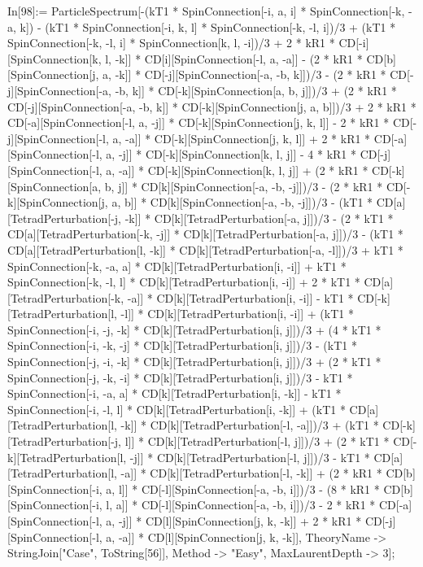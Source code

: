 In[98]:= ParticleSpectrum[-(kT1 * SpinConnection[-i, a, i] * SpinConnection[-k, -a, k]) - (kT1 * SpinConnection[-i, k, l] * SpinConnection[-k, -l, i])/3 + (kT1 * SpinConnection[-k, -l, i] * SpinConnection[k, l, -i])/3 + 2 * kR1 * CD[-i][SpinConnection[k, l, -k]] * CD[i][SpinConnection[-l, a, -a]] - (2 * kR1 * CD[b][SpinConnection[j, a, -k]] * CD[-j][SpinConnection[-a, -b, k]])/3 - (2 * kR1 * CD[-j][SpinConnection[-a, -b, k]] * CD[-k][SpinConnection[a, b, j]])/3 + (2 * kR1 * CD[-j][SpinConnection[-a, -b, k]] * CD[-k][SpinConnection[j, a, b]])/3 + 2 * kR1 * CD[-a][SpinConnection[-l, a, -j]] * CD[-k][SpinConnection[j, k, l]] - 2 * kR1 * CD[-j][SpinConnection[-l, a, -a]] * CD[-k][SpinConnection[j, k, l]] + 2 * kR1 * CD[-a][SpinConnection[-l, a, -j]] * CD[-k][SpinConnection[k, l, j]] - 4 * kR1 * CD[-j][SpinConnection[-l, a, -a]] * CD[-k][SpinConnection[k, l, j]] + (2 * kR1 * CD[-k][SpinConnection[a, b, j]] * CD[k][SpinConnection[-a, -b, -j]])/3 - (2 * kR1 * CD[-k][SpinConnection[j, a, b]] * CD[k][SpinConnection[-a, -b, -j]])/3 - (kT1 * CD[a][TetradPerturbation[-j, -k]] * CD[k][TetradPerturbation[-a, j]])/3 - (2 * kT1 * CD[a][TetradPerturbation[-k, -j]] * CD[k][TetradPerturbation[-a, j]])/3 - (kT1 * CD[a][TetradPerturbation[l, -k]] * CD[k][TetradPerturbation[-a, -l]])/3 + kT1 * SpinConnection[-k, -a, a] * CD[k][TetradPerturbation[i, -i]] + kT1 * SpinConnection[-k, -l, l] * CD[k][TetradPerturbation[i, -i]] + 2 * kT1 * CD[a][TetradPerturbation[-k, -a]] * CD[k][TetradPerturbation[i, -i]] - kT1 * CD[-k][TetradPerturbation[l, -l]] * CD[k][TetradPerturbation[i, -i]] + (kT1 * SpinConnection[-i, -j, -k] * CD[k][TetradPerturbation[i, j]])/3 + (4 * kT1 * SpinConnection[-i, -k, -j] * CD[k][TetradPerturbation[i, j]])/3 - (kT1 * SpinConnection[-j, -i, -k] * CD[k][TetradPerturbation[i, j]])/3 + (2 * kT1 * SpinConnection[-j, -k, -i] * CD[k][TetradPerturbation[i, j]])/3 - kT1 * SpinConnection[-i, -a, a] * CD[k][TetradPerturbation[i, -k]] - kT1 * SpinConnection[-i, -l, l] * CD[k][TetradPerturbation[i, -k]] + (kT1 * CD[a][TetradPerturbation[l, -k]] * CD[k][TetradPerturbation[-l, -a]])/3 + (kT1 * CD[-k][TetradPerturbation[-j, l]] * CD[k][TetradPerturbation[-l, j]])/3 + (2 * kT1 * CD[-k][TetradPerturbation[l, -j]] * CD[k][TetradPerturbation[-l, j]])/3 - kT1 * CD[a][TetradPerturbation[l, -a]] * CD[k][TetradPerturbation[-l, -k]] + (2 * kR1 * CD[b][SpinConnection[-i, a, l]] * CD[-l][SpinConnection[-a, -b, i]])/3 - (8 * kR1 * CD[b][SpinConnection[-i, l, a]] * CD[-l][SpinConnection[-a, -b, i]])/3 - 2 * kR1 * CD[-a][SpinConnection[-l, a, -j]] * CD[l][SpinConnection[j, k, -k]] + 2 * kR1 * CD[-j][SpinConnection[-l, a, -a]] * CD[l][SpinConnection[j, k, -k]], TheoryName -> StringJoin["Case", ToString[56]], Method -> "Easy", MaxLaurentDepth -> 3]; 